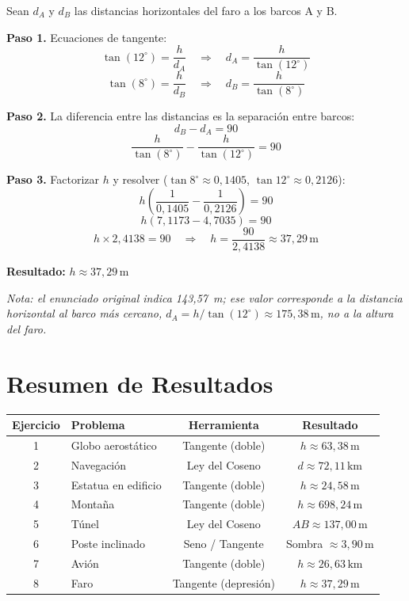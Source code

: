 \documentclass[11pt, letterpaper]{article}
\begin{document}
Sean \(d_A\) y \(d_B\) las distancias horizontales del faro a los barcos A y B.

\textbf{Paso 1.} Ecuaciones de tangente:
\[
  \tan(12^\circ) = \frac{h}{d_A}
  \quad\Longrightarrow\quad
  d_A = \frac{h}{\tan(12^\circ)} \tag{1}
\]
\[
  \tan(8^\circ) = \frac{h}{d_B}
  \quad\Longrightarrow\quad
  d_B = \frac{h}{\tan(8^\circ)} \tag{2}
\]

\textbf{Paso 2.} La diferencia entre las distancias es la separación entre barcos:
\[
  d_B - d_A = 90
\]
\[
  \frac{h}{\tan(8^\circ)} - \frac{h}{\tan(12^\circ)} = 90
\]

\textbf{Paso 3.} Factorizar \(h\) y resolver
(\(\tan 8^\circ \approx 0{,}1405\), \(\tan 12^\circ \approx 0{,}2126\)):
\[
  h\left(\frac{1}{0{,}1405} - \frac{1}{0{,}2126}\right) = 90
\]
\[
  h\left(7{,}1173 - 4{,}7035\right) = 90
\]
\[
  h \times 2{,}4138 = 90
  \quad\Longrightarrow\quad
  h = \frac{90}{2{,}4138} \approx 37{,}29\,\text{m}
\]

\begin{resultbox}
\textbf{Resultado:} \quad \(h \approx 37{,}29\,\text{m}\)

\small\textit{Nota: el enunciado original indica 143{,}57~m; ese valor corresponde a la
distancia horizontal al barco más cercano, \(d_A = h/\tan(12^\circ) \approx 175{,}38\,\text{m}\),
no a la altura del faro.}
\end{resultbox}

\newpage
\section*{Resumen de Resultados}

\begin{center}
\renewcommand{\arraystretch}{1.5}
\begin{tabular}{@{}clcc@{}}
\toprule
\textbf{Ejercicio} & \textbf{Problema} & \textbf{Herramienta} & \textbf{Resultado} \\
\midrule
1 & Globo aerostático   & Tangente (doble)      & \(h \approx 63{,}38\,\text{m}\) \\
2 & Navegación          & Ley del Coseno        & \(d \approx 72{,}11\,\text{km}\) \\
3 & Estatua en edificio & Tangente (doble)      & \(h \approx 24{,}58\,\text{m}\) \\
4 & Montaña             & Tangente (doble)      & \(h \approx 698{,}24\,\text{m}\) \\
5 & Túnel               & Ley del Coseno        & \(AB \approx 137{,}00\,\text{m}\) \\
6 & Poste inclinado     & Seno / Tangente       & Sombra \(\approx 3{,}90\,\text{m}\) \\
7 & Avión               & Tangente (doble)      & \(h \approx 26{,}63\,\text{km}\) \\
8 & Faro                & Tangente (depresión)  & \(h \approx 37{,}29\,\text{m}\) \\
\bottomrule
\end{tabular}
\end{center}
\end{document}
